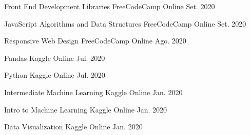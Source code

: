 

\begin{cvhonors}

  \cvhonor
    {Front End Development Libraries} %
    {FreeCodeCamp} %
    {Online} %
    {Set. 2020} %

  \cvhonor
    {JavaScript Algorithms and Data Structures} %
    {FreeCodeCamp} %
    {Online} %
    {Set. 2020} %

  \cvhonor
    {Responsive Web Design} %
    {FreeCodeCamp} %
    {Online} %
    {Ago. 2020} %

  \cvhonor
    {Pandas} %
    {Kaggle} %
    {Online} %
    {Jul. 2020} %

  \cvhonor
    {Python} %
    {Kaggle} %
    {Online} %
    {Jul. 2020} %

  \cvhonor
    {Intermediate Machine Learning} %
    {Kaggle} %
    {Online} %
    {Jan. 2020} %

  \cvhonor
    {Intro to Machine Learning} %
    {Kaggle} %
    {Online} %
    {Jan. 2020} %

  \cvhonor
    {Data Visualization} %
    {Kaggle} %
    {Online} %
    {Jan. 2020} %

\end{cvhonors}
